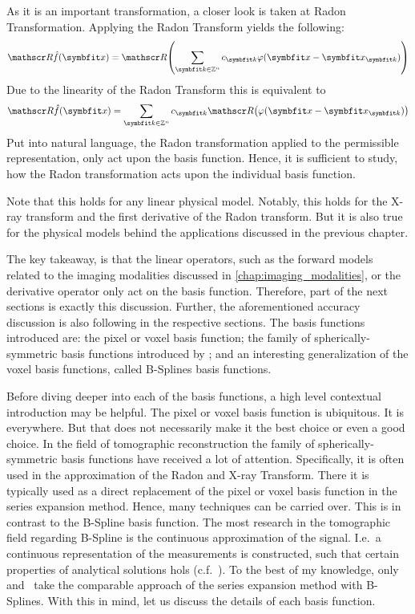 As it is an important transformation, a closer look is taken at Radon Transformation. Applying the
Radon Transform yields the following:
\[ \radon\near{f}(\mvec{x}) = \radon\left( \sum_{\mvec{k} \in \mathbb{Z}^n} c_{\mvec{k}} \varphi(\mvec{x} - \mvec{x}_{\mvec{k}}) \right) \]
Due to the linearity of the Radon Transform this is equivalent to
\[ \radon\hat{f}(\mvec{x}) = \sum_{\mvec{k} \in \mathbb{Z}^n} c_{\mvec{k}}\radon\left( \varphi(\mvec{x} - \mvec{x}_{\mvec{k}}) \right) \]
Put into natural language, the Radon transformation applied to the permissible representation, only
act upon the basis function. Hence, it is sufficient to study, how the Radon transformation acts
upon the individual basis function.

Note that this holds for any linear physical model. Notably, this holds for the X-ray transform and
the first derivative of the Radon transform. But it is also true for the physical models behind the
applications discussed in the previous chapter.

The key takeaway, is that the linear operators, such as the forward models related to the imaging
modalities discussed in \autoref{chap:imaging_modalities}, or the derivative operator only act on
the basis function. Therefore, part of the next sections is exactly this discussion. Further, the
aforementioned accuracy discussion is also following in the respective sections. The basis functions
introduced are: the pixel or voxel basis function; the family of spherically-symmetric basis
functions introduced by \citeauthor*{lewitt_multidimensional_1990}; and an interesting
generalization of the voxel basis functions, called B-Splines basis functions.

Before diving deeper into each of the basis functions, a high level contextual introduction may be
helpful. The pixel or voxel basis function is ubiquitous. It is everywhere. But that does not
necessarily make it the best choice or even a good choice. In the field of tomographic
reconstruction the family of spherically-symmetric basis functions have received a lot of attention.
Specifically, it is often used in the approximation of the Radon and X-ray Transform. There it is
typically used as a direct replacement of the pixel or voxel basis function in the series expansion
method. Hence, many techniques can be carried over. This is in contrast to the B-Spline basis
function. The most research in the tomographic field regarding B-Spline is the continuous
approximation of the signal. I.e.\ a continuous representation of the measurements is constructed,
such that certain properties of analytical solutions hols (c.f.~\cite{horbelt_discretization_2002}).
To the best of my knowledge, only~\cite{nilchian_fast_2013}
and~\cite{momey_new_2011,momey_b-spline_2012,momey_spline_2015} take the comparable approach of the
series expansion method with B-Splines. With this in mind, let us discuss the details of each basis
function.

